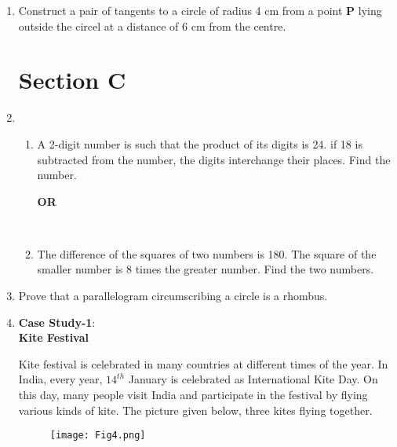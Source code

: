\begin{enumerate}[\arabic*]
\item Construct a pair of tangents to a circle of radius 4 cm from a point \textbf{P} lying outside the circel at a distance of 6 cm from the centre. \\


     
\section{\textbf{Section C}}
   
\item
    \begin{enumerate}
    
    \item A 2-digit number is such that the product of its digits is 24. if 18 is subtracted from the number, the digits interchange their places. Find the number. \\
    
\begin{center}
   \textbf{OR}
\end{center}

    \vspace{2mm} \\
    
    \item The difference of the squares of two numbers is 180. The square of the smaller number is 8 times the greater number. Find the two numbers. \\
    
\end{enumerate}
    
\item Prove that a parallelogram circumscribing a circle is a rhombus.\\

\item \textbf{Case Study-1}: \\
        
        
 \textbf{Kite Festival} 
        
        Kite festival is celebrated in many countries at different times of the year. In India, every year, $14^{th}$ January is celebrated as International Kite Day. On this day, many people visit India and participate in the festival by flying various kinds of kite. 
        The picture given below, three kites flying together.
        
        \begin{figure}[h!]
        \centering
        \texttt{[image: Fig4.png]}
    	\caption{}
    	\label{Fig4}
     \end{figure} 
        

\end{enumerate}
